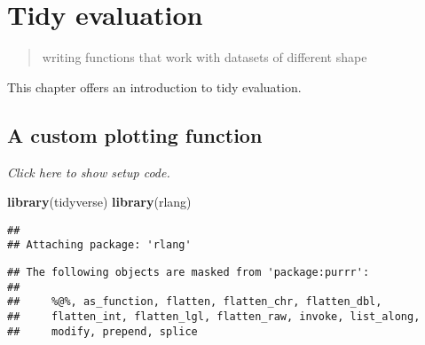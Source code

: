 \documentclass[]{book}
\newenvironment{Shaded}{\begin{snugshade}}{\end{snugshade}}
\newcommand{\ControlFlowTok}[1]{\textcolor[rgb]{0.13,0.29,0.53}{\textbf{#1}}}
\newcommand{\DataTypeTok}[1]{\textcolor[rgb]{0.13,0.29,0.53}{#1}}
\newcommand{\DecValTok}[1]{\textcolor[rgb]{0.00,0.00,0.81}{#1}}
\newcommand{\KeywordTok}[1]{\textcolor[rgb]{0.13,0.29,0.53}{\textbf{#1}}}
\newcommand{\NormalTok}[1]{#1}
\newcommand{\OperatorTok}[1]{\textcolor[rgb]{0.81,0.36,0.00}{\textbf{#1}}}
\newcommand{\StringTok}[1]{\textcolor[rgb]{0.31,0.60,0.02}{#1}}
\begin{document}
\hypertarget{tidy-evaluation}{%
\chapter{Tidy evaluation}\label{tidy-evaluation}}

\begin{quote}
writing functions that work with datasets of different shape
\end{quote}

This chapter offers an introduction to tidy evaluation.

\hypertarget{a-custom-plotting-function}{%
\section{A custom plotting function}\label{a-custom-plotting-function}}

\emph{Click here to show setup code.}

\begin{Shaded}
\begin{Highlighting}[]
\KeywordTok{library}\NormalTok{(tidyverse)}
\KeywordTok{library}\NormalTok{(rlang)}
\end{Highlighting}
\end{Shaded}

\begin{verbatim}
## 
## Attaching package: 'rlang'
\end{verbatim}

\begin{verbatim}
## The following objects are masked from 'package:purrr':
## 
##     %@%, as_function, flatten, flatten_chr, flatten_dbl,
##     flatten_int, flatten_lgl, flatten_raw, invoke, list_along,
##     modify, prepend, splice
\end{verbatim}

\begin{Shaded}
\end{Shaded}

\begin{Shaded}
\end{Shaded}
\end{document}
